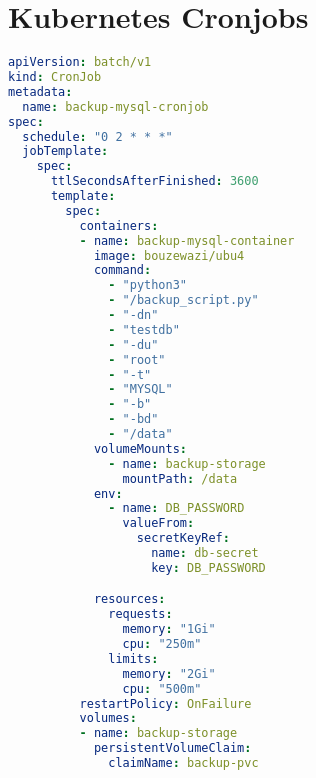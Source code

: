 \chapter{Kubernetes Cronjobs}
\label{sec:cron}
\begin{lstlisting}[language=YAML, caption={YAML-bestand voor de configuratie van de Kubernetes CronJob die een back-up neemt van de MySQL databank.}]
apiVersion: batch/v1
kind: CronJob
metadata:
  name: backup-mysql-cronjob
spec:
  schedule: "0 2 * * *"  
  jobTemplate:
    spec:
      ttlSecondsAfterFinished: 3600  
      template:
        spec:
          containers:
          - name: backup-mysql-container
            image: bouzewazi/ubu4
            command: 
              - "python3"
              - "/backup_script.py"
              - "-dn"
              - "testdb"
              - "-du"
              - "root"
              - "-t"
              - "MYSQL"
              - "-b"
              - "-bd"
              - "/data"
            volumeMounts:
              - name: backup-storage
                mountPath: /data  
            env:
              - name: DB_PASSWORD
                valueFrom:
                  secretKeyRef:
                    name: db-secret
                    key: DB_PASSWORD

            resources:
              requests:
                memory: "1Gi"  
                cpu: "250m"      
              limits:
                memory: "2Gi"  
                cpu: "500m"      
          restartPolicy: OnFailure
          volumes:
          - name: backup-storage
            persistentVolumeClaim:
              claimName: backup-pvc

\end{lstlisting}


